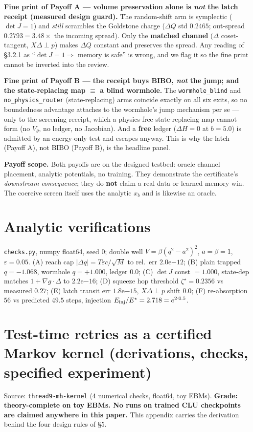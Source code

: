 \documentclass[11pt]{article}
\newcommand{\detJ}{\det J}
\begin{document}
\textbf{Fine print of Payoff A --- volume preservation alone is \emph{not} the latch receipt (measured design guard).} The random-shift arm is symplectic ($\detJ=1$) and \emph{still} scrambles the Goldstone charge ($\Delta Q$ std $0.2465$; out-spread $0.2793=3.48\times$ the incoming spread). Only the \textbf{matched channel} ($\Delta$ coset-tangent, $X\Delta\perp p$) makes $\Delta Q$ constant and preserves the spread. Any reading of \S3.2.1 as ``$\detJ=1\Rightarrow$ memory is safe'' is wrong, and we flag it so the fine print cannot be inverted into the review.

\textbf{Fine print of Payoff B --- the receipt buys BIBO, \emph{not} the jump; and the state-replacing map $\equiv$ a blind wormhole.} The \texttt{wormhole\_blind} and \texttt{no\_physics\_router} (state-replacing) arms coincide exactly on all six exits, so no boundedness advantage attaches to the wormhole's jump mechanism per se --- only to the screening receipt, which a physics-free state-replacing map cannot form (no $V_\theta$, no ledger, no Jacobian). And a \textbf{free} ledger ($\Delta H=0$ at $b=5.0$) is admitted by an energy-only test and escapes anyway. This is why the latch (Payoff A), not BIBO (Payoff B), is the headline panel.

\textbf{Payoff scope.} Both payoffs are on the designed testbed: oracle channel placement, analytic potentials, no training. They demonstrate the certificate's \emph{downstream consequence}; they do \textbf{not} claim a real-data or learned-memory win. The coercive screen itself uses the analytic $x_b$ and is likewise an oracle.

\section{Analytic verifications}
\texttt{checks.py}, numpy float64, seed 0; double well $V=\beta(q^2-a^2)^2$, $a=\beta=1$, $\varepsilon=0.05$. (A) reach cap $|\Delta q|=T\varepsilon c/\sqrt{M}$ to rel.\ err $2.0\mathrm{e}{-12}$; (B) plain trapped $q=-1.068$, wormhole $q=+1.000$, ledger $0.0$; (C) $\detJ$ const $=1.000$, state-dep matches $1+\nabla g\cdot\Delta$ to $2.2\mathrm{e}{-16}$; (D) squeeze hop threshold $\zeta^\star=0.2356$ vs measured $0.27$; (E) latch transit err $1.8\mathrm{e}{-15}$, $X\Delta\perp p$ shift $0.0$; (F) re-absorption $56$ vs predicted $49.5$ steps, injection $E_{\rm inj}/E^\star=2.718=e^{2\cdot0.5}$.

\section{Test-time retries as a certified Markov kernel (derivations, checks, specified experiment)}
Source: \texttt{thread9-mh-kernel} ($4$ numerical checks, float64, toy EBMs). \textbf{Grade: theory-complete on toy EBMs. No runs on trained CLU checkpoints are claimed anywhere in this paper.} This appendix carries the derivation behind the four design rules of \S5.
\end{document}
